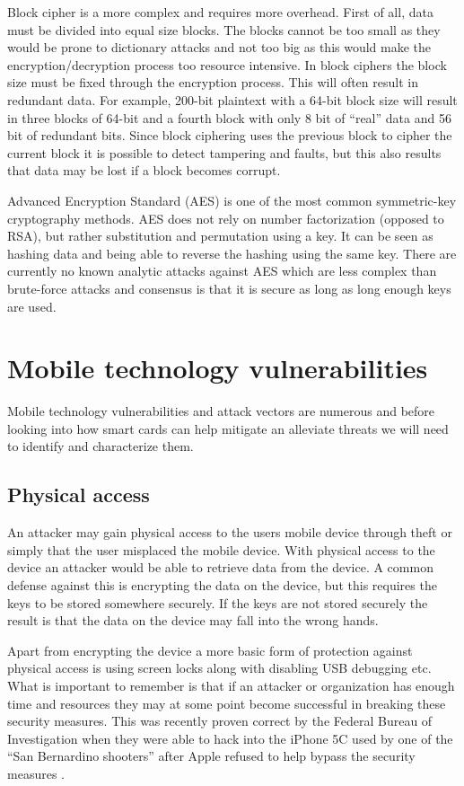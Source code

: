 Block cipher is a more complex and requires more overhead. First of all, data must be divided into equal size blocks. The blocks cannot be too small as they would be prone to dictionary attacks and not too big as this would make the encryption/decryption process too resource intensive. In block ciphers the block size must be fixed through the encryption process. This will often result in redundant data. For example, 200-bit plaintext with a 64-bit block size will result in three blocks of 64-bit and a fourth block with only 8 bit of ``real'' data and 56 bit of redundant bits. Since block ciphering uses the previous block to cipher the current block it is possible to detect tampering and faults, but this also results that data may be lost if a block becomes corrupt.

Advanced Encryption Standard (AES) is one of the most common symmetric-key cryptography methods. AES does not rely on number factorization (opposed to RSA), but rather substitution and permutation using a key. It can be seen as hashing data and being able to reverse the hashing using the same key. There are currently no known analytic attacks against AES which are less complex than brute-force attacks and consensus is that it is secure as long as long enough keys are used.

\section{Mobile technology vulnerabilities}
Mobile technology vulnerabilities and attack vectors are numerous and before looking into how smart cards can help mitigate an alleviate threats we will need to identify and characterize them.

\subsection{Physical access}
An attacker may gain physical access to the users mobile device through theft or simply that the user misplaced the mobile device. With physical access to the device an attacker would be able to retrieve data from the device. A common defense against this is encrypting the data on the device, but this requires the keys to be stored somewhere securely. If the keys are not stored securely the result is that the data on the device may fall into the wrong hands.

Apart from encrypting the device a more basic form of protection against physical access is using screen locks along with disabling USB debugging etc. What is important to remember is that if an attacker or organization has enough time and resources they may at some point become successful in breaking these security measures. This was recently proven correct by the Federal Bureau of Investigation when they were able to hack into the iPhone 5C used by one of the ``San Bernardino shooters'' after Apple refused to help bypass the security measures \cite{iphoneHack}.

